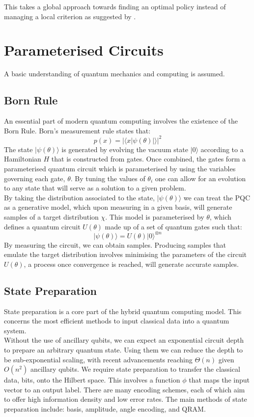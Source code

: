 \documentclass[12pt]{article}
\numberwithin{equation}{section}
\begin{document}
This takes a global approach towards finding an optimal policy instead of 
managing a local criterion as suggested by \cite{Fecamp}.


\clearpage 
\section{Parameterised Circuits}
A basic understanding of quantum mechanics and computing is assumed. 
\subsection{Born Rule}
An essential part of modern quantum computing involves the existence of the Born
Rule. Born's measurement rule states that:
\begin{equation}
p(x) = |\langle x|\psi(\theta)|\rangle|^2
\end{equation}
The state $|\psi(\theta)\rangle$ is generated by evolving the vacuum state $|0\rangle$
according to a Hamiltonian $H$ that is constructed from gates. Once combined, the 
gates form a parameterised quantum circuit which is parameterised by using the 
variables governing each gate, $\theta$. By tuning the values of $\theta_i$ one 
can allow for an evolution to any state that will serve as a solution to a given 
problem. \\ 
By taking the distribution associated to the state, $|\psi(\theta)\rangle$ we can 
treat the PQC as a generative model, which upon measuring in a given basis, will 
generate samples of a target distribution $\chi$. This model is parameterised 
by $\theta$, which defines a quantum circuit $U(\theta)$ made up of a set of quantum 
gates such that:
\begin{equation}
|\psi(\theta)\rangle = U(\theta)|0\rangle^{\otimes n}
\end{equation}
By measuring the circuit, we can obtain samples. Producing samples that emulate 
the target distribution involves minimising the parameters of the circuit $U(\theta)$, 
a process once convergence is reached, will generate accurate samples. 
\cite{bornmachine}

\subsection{State Preparation}
State preparation is a core part of the hybrid quantum computing model. This 
concerns the most efficient methods to input classical data into a quantum system.
\\
Without the use of ancillary qubits, we can expect an exponential circuit depth
to prepare an arbitrary quantum state. Using them we can reduce the depth to be 
sub-exponential scaling, with recent advancements reaching $\Theta(n)$ given $O(n^2)$
ancillary qubits.
\cite{stateprep1}
\cite{stateprep2}
We require state preparation to transfer the classical data, bits, onto the 
Hilbert space. This involves a function $\phi$ that maps the input vector to 
an output label. There are many encoding schemes, each of which aim to offer 
high information density and low error rates.
The main methods of state preparation include: basis, amplitude, angle encoding,
and QRAM. 
\end{document}
